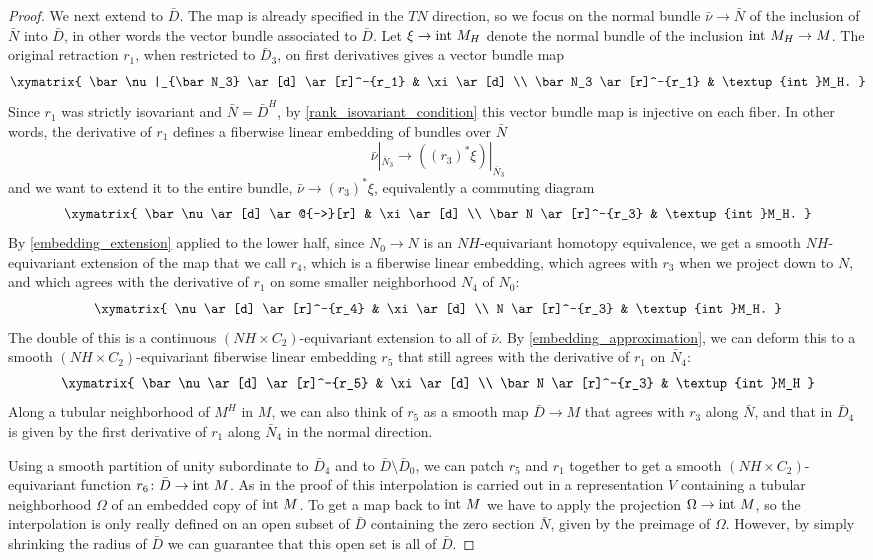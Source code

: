 \documentclass[11pt]{amsart}
\theoremstyle{definition}
\numberwithin{equation}{section}
\numberwithin{figure}{section}
\newcommand{\ra}{\longrightarrow}
\begin{document}
\begin{proof}
	We next extend to $\bar D$. The map is already specified in the $TN$ direction, so we focus on the normal bundle $\bar \nu \to \bar N$ of the inclusion of $\bar N$ into $\bar D$, in other words the vector bundle associated to $\bar D$. Let $\xi \to \textup{int }M_H$ denote the normal bundle of the inclusion $\textup{int }M_H \to M$. The original retraction $r_1$, when restricted to $\bar D_3$, on first derivatives gives a vector bundle map
	\[ \xymatrix{
		\bar \nu|_{\bar N_3} \ar[d] \ar[r]^-{r_1} & \xi \ar[d] \\
		\bar N_3 \ar[r]^-{r_1} & \textup{int }M_H.
	} \]
	Since $r_1$ was strictly isovariant and $\bar N = \bar D^H$, by \autoref{rank_isovariant_condition} this vector bundle map is injective on each fiber. In other words, the derivative of $r_1$ defines a fiberwise linear embedding of bundles over $\bar N$
	\[ \bar \nu|_{\bar N_3} \ra ((r_3)^*\xi)|_{\bar N_3} \]
	and we want to extend it to the entire bundle, $\bar \nu \to (r_3)^*\xi$, equivalently a commuting diagram
	\[ \xymatrix{
		\bar \nu \ar[d] \ar@{-->}[r] & \xi \ar[d] \\
		\bar N \ar[r]^-{r_3} & \textup{int }M_H.
	} \]
	By \autoref{embedding_extension} applied to the lower half, since $N_0 \to N$ is an $NH$-equivariant homotopy equivalence, we get a smooth $NH$-equivariant extension of the map that we call $r_4$, which is a fiberwise linear embedding, which agrees with $r_3$ when we project down to $N$, and which agrees with the derivative of $r_1$ on some smaller neighborhood $N_4$ of $N_0$:
	\[ \xymatrix{
		\nu \ar[d] \ar[r]^-{r_4} & \xi \ar[d] \\
		N \ar[r]^-{r_3} & \textup{int }M_H.
	} \]
	The double of this is a continuous $(NH \times C_2)$-equivariant extension to all of $\bar \nu$. By \autoref{embedding_approximation}, we can deform this to a smooth $(NH \times C_2)$-equivariant fiberwise linear embedding $r_5$ that still agrees with the derivative of $r_1$ on $\bar N_4$:
	\[ \xymatrix{
		\bar \nu \ar[d] \ar[r]^-{r_5} & \xi \ar[d] \\
		\bar N \ar[r]^-{r_3} & \textup{int }M_H
	} \]
	Along a tubular neighborhood of $M^H$ in $M$, we can also think of $r_5$ as a smooth map $\bar D \to M$ that agrees with $r_3$ along $\bar N$, and that in $\bar D_4$ is given by the first derivative of $r_1$ along $\bar N_4$ in the normal direction.
	
	Using a smooth partition of unity subordinate to $\bar D_4$ and to $\bar D \setminus \bar D_0$, we can patch $r_5$ and $r_1$ together to get a smooth $(NH \times C_2)$-equivariant function $r_6\colon \bar D \to \textup{int }M$. As in the proof of \cite[Lemma 2.28 and Prop 2.42]{GIMM1} this interpolation is carried out in a representation $V$ containing a tubular neighborhood $\Omega$ of an embedded copy of $\textup{int }M$. To get a map back to $\textup{int }M$ we have to apply the projection $\Omega \to \textup{int }M$, so the interpolation is only really defined on an open subset of $\bar D$ containing the zero section $\bar N$, given by the preimage of $\Omega$. However, by simply shrinking the radius of $\bar D$ we can guarantee that this open set is all of $\bar D$.
	

\end{proof}
\end{document}
